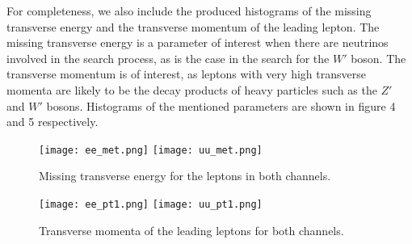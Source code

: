 \documentclass{article}
\begin{document}
\begin{titlepage}
{{For completeness, we also include the produced histograms of the missing transverse energy and the transverse momentum of the leading lepton. The missing transverse energy is a parameter of interest when there are neutrinos involved in the search process, as is the case in the search for the $W'$ boson. The transverse momentum is of interest, as leptons with very high transverse momenta are likely to be the decay products of heavy particles such as the $Z'$ and $W'$ bosons. Histograms of the mentioned parameters are shown in figure 4 and 5 respectively.




\begin{figure}[h]\label{fig:missing_Et}
    \begin{center}
        \texttt{[image: ee\_met.png]}
        \texttt{[image: uu\_met.png]}
        \caption{Missing transverse energy for the leptons in both channels.}
        \label{fig:ee_mll_6TeV}
     \end{center}
\end{figure}

\begin{figure}[h]\label{fig:leading_pt}
    \begin{center}
        \texttt{[image: ee\_pt1.png]}
        \texttt{[image: uu\_pt1.png]}
        \caption{Transverse momenta of the leading leptons for both channels.}
        \label{fig:ee_mll_6TeV}
     \end{center}
\end{figure}










}}
\end{titlepage}
\end{document}
